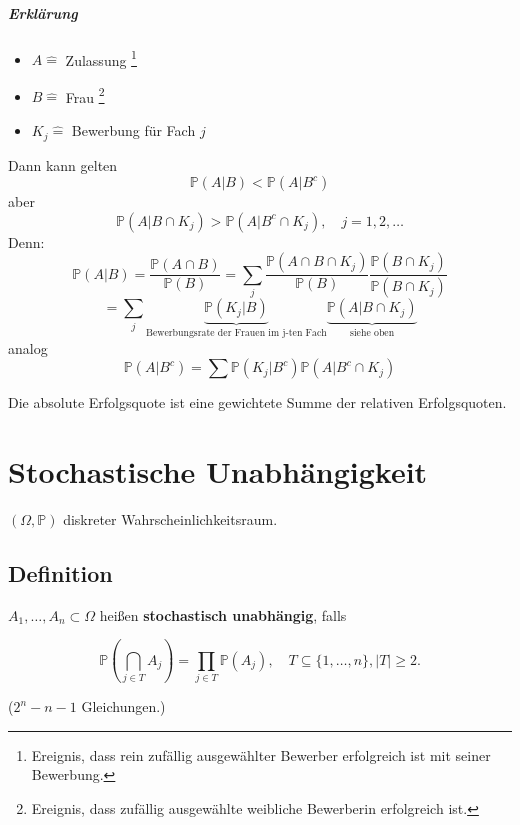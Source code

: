 \documentclass[a4paper,11pt,notitlepage]{report}
\newcommand{\Prim}{{\ensuremath{\mathbb{P}}}}
\begin{document}
\paragraph{Erklärung}
\begin{itemize}
	\item $A \hat{=}$ Zulassung \footnote{Ereignis, dass rein zufällig ausgewählter Bewerber erfolgreich ist mit seiner Bewerbung.}
	\item $B \hat{=}$ Frau \footnote{Ereignis, dass zufällig ausgewählte weibliche Bewerberin erfolgreich ist.}
	\item $K_j \hat{=}$ Bewerbung für Fach $j$
\end{itemize}

Dann kann gelten
$$\Prim(A|B) < \Prim(A | B^c)$$
aber
$$\Prim(A|B \cap K_j) > \Prim(A|B^c \cap K_j), \quad j=1,2,\ldots$$
Denn:
$$\Prim(A|B)= \frac{\Prim(A\cap B)}{\Prim(B)} = \sum\limits_{j}{\frac{\Prim(A \cap B\cap K_j)}{\Prim(B)} \frac{\Prim(B \cap K_j)}{\Prim(B \cap K_j)}}$$
$$ = \sum\limits_{j}{\underbrace{\Prim(K_j|B)}_{\text{Bewerbungsrate der Frauen im j-ten Fach}}\underbrace{\Prim(A|B \cap K_j)}_{\text{siehe oben}}}$$
analog
$$\Prim(A|B^c) = \sum{\Prim(K_j|B^c) \Prim(A|B^c \cap K_j)}$$

Die absolute Erfolgsquote ist eine gewichtete Summe der relativen Erfolgsquoten.

\chapter{Stochastische Unabhängigkeit}
$(\Omega, \Prim)$ diskreter Wahrscheinlichkeitsraum.

\section{Definition}
$A_1, \ldots, A_n \subset \Omega$ heißen \textbf{stochastisch unabhängig}, falls

$$\Prim(\bigcap\limits_{j \in T}{A_j}) = \prod\limits_{j \in T}{\Prim(A_j)}, \quad T \subseteq \{1, \ldots, n\}, |T| \geq 2.$$

($2^n - n - 1$ Gleichungen.)
\end{document}
